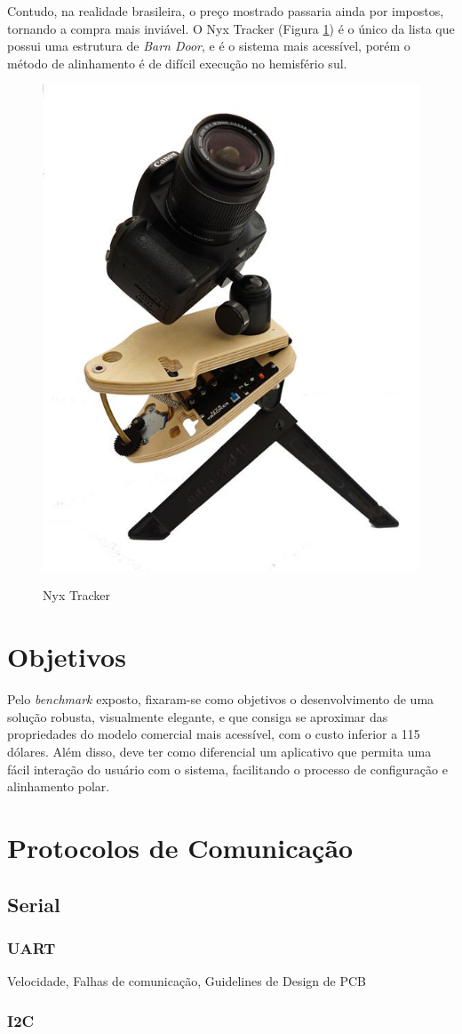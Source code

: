 Contudo, na realidade brasileira, o preço mostrado passaria ainda por impostos, tornando a compra mais inviável. O Nyx Tracker (Figura \ref{fig:nyxtracker}) é o único da lista que possui uma estrutura de \textit{Barn Door}, e é o sistema mais acessível, porém o método de alinhamento é de difícil execução no hemisfério sul.

\begin{figure}[h]
	\centering
	\caption{Nyx Tracker}
	\includegraphics[width=0.3\linewidth]{figuras/nyxtracker}
	\label{fig:nyxtracker}
\end{figure}


\section{Objetivos}

Pelo \textit{benchmark} exposto, fixaram-se como objetivos o desenvolvimento de uma solução robusta, visualmente elegante, e que consiga se aproximar das propriedades do modelo comercial mais acessível, com o custo inferior a 115 dólares. Além disso, deve ter como diferencial um aplicativo que permita uma fácil interação do usuário com o sistema, facilitando o processo de configuração e alinhamento polar.

\section{Protocolos de Comunicação}

\subsection{Serial}
\subsubsection{UART}
Velocidade, Falhas de comunicação, Guidelines de Design de PCB

\subsubsection{I2C}

